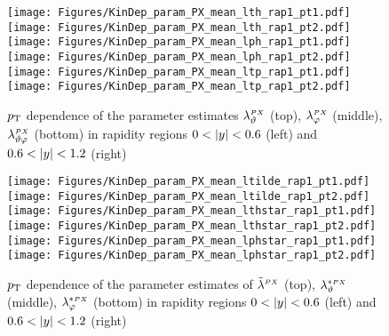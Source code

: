 


\begin{figure}[htbp]
\centering
\texttt{[image: Figures/KinDep\_param\_PX\_mean\_lth\_rap1\_pt1.pdf]}
\texttt{[image: Figures/KinDep\_param\_PX\_mean\_lth\_rap1\_pt2.pdf]}
\texttt{[image: Figures/KinDep\_param\_PX\_mean\_lph\_rap1\_pt1.pdf]}
\texttt{[image: Figures/KinDep\_param\_PX\_mean\_lph\_rap1\_pt2.pdf]}
\texttt{[image: Figures/KinDep\_param\_PX\_mean\_ltp\_rap1\_pt1.pdf]}
\texttt{[image: Figures/KinDep\_param\_PX\_mean\_ltp\_rap1\_pt2.pdf]}
\caption{$p_\mathrm{T}$ dependence of the parameter estimates $\lambda^{\scriptscriptstyle PX}_\vartheta$ (top), $\lambda^{\scriptscriptstyle PX}_\varphi$ (middle), $\lambda^{\scriptscriptstyle PX}_{\vartheta \varphi}$ (bottom) in rapidity regions $0<\left | y \right |<0.6$ (left) and $0.6<\left | y \right |<1.2$ (right)}
\end{figure}
\clearpage

\begin{figure}[htbp]
\centering
\texttt{[image: Figures/KinDep\_param\_PX\_mean\_ltilde\_rap1\_pt1.pdf]}
\texttt{[image: Figures/KinDep\_param\_PX\_mean\_ltilde\_rap1\_pt2.pdf]}
\texttt{[image: Figures/KinDep\_param\_PX\_mean\_lthstar\_rap1\_pt1.pdf]}
\texttt{[image: Figures/KinDep\_param\_PX\_mean\_lthstar\_rap1\_pt2.pdf]}
\texttt{[image: Figures/KinDep\_param\_PX\_mean\_lphstar\_rap1\_pt1.pdf]}
\texttt{[image: Figures/KinDep\_param\_PX\_mean\_lphstar\_rap1\_pt2.pdf]}
\caption{$p_\mathrm{T}$ dependence of the parameter estimates of $\tilde{\lambda}^{\scriptscriptstyle PX}$ (top),
$\lambda^{* \scriptscriptstyle PX}_\vartheta$ (middle), $\lambda^{* \scriptscriptstyle PX}_\varphi$ (bottom) in rapidity regions $0<\left | y \right |<0.6$ (left) and $0.6<\left | y \right |<1.2$ (right)}
\end{figure}
\clearpage








